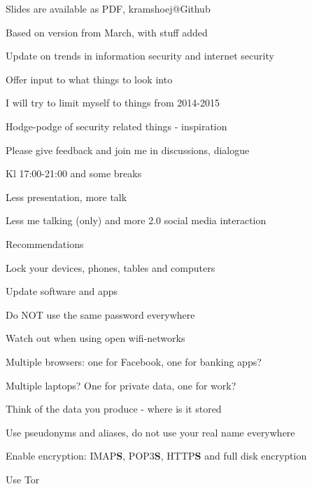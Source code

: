 \documentclass[20pt,landscape,a4paper,footrule]{foils}
\begin{document}


\vskip 2cm
\centerline{\tiny Slides are available as PDF, kramshoej@Github}

Based on version from March, with stuff added


\begin{list1}
\item Update on trends in information security and internet security
\item Offer input to what things to look into
\item I will try to limit myself to things from 2014-2015
\item Hodge-podge of security related things - inspiration
\item Please give feedback and join me in discussions, dialogue \smiley
\end{list1}



\begin{list1}
\item Kl 17:00-21:00 and some breaks
\item Less presentation, more talk
\item Less me talking (only) and more 2.0 social media interaction
\end{list1}


Recommendations 
\begin{list2}
\item Lock your devices, phones, tables and computers
\item Update software and apps
\item Do NOT use the same password everywhere
\item Watch out when using open wifi-networks
\item Multiple browsers: one for Facebook, one for banking apps?
\item Multiple laptops? One for private data, one for work?
\item Think of the data you produce - where is it stored
\item Use pseudonyms and aliases, do not use your real name everywhere
\item Enable encryption: IMAP{\bf S}, POP3{\bf S},
  HTTP{\bf S} and full disk encryption
\item Use Tor 
\end{list2}
\end{document}
